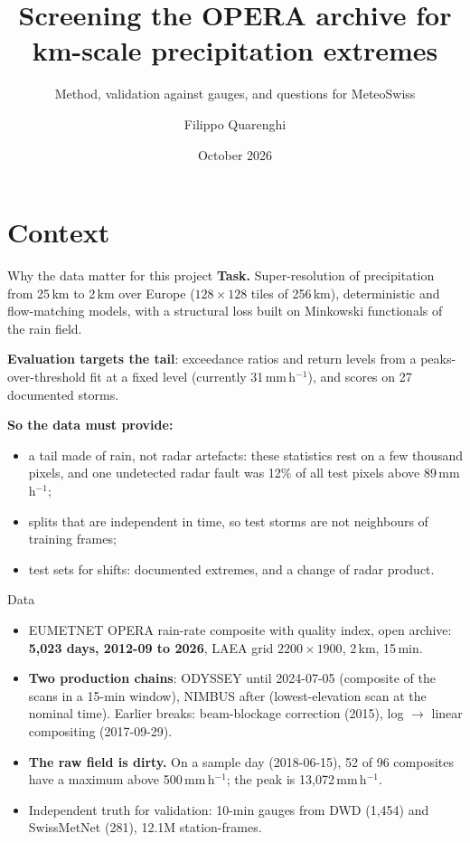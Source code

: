 \documentclass[aspectratio=169,10pt]{beamer}
\title{Screening the OPERA archive for km-scale precipitation extremes}
\subtitle{Method, validation against gauges, and questions for MeteoSwiss}
\author{Filippo Quarenghi}
\institute{University of Lausanne}
\date{October 2026}
\newcommand{\mmh}{\,mm\,h$^{-1}$}
\begin{document}
\begin{frame}
  \titlepage
\end{frame}

\section{Context}

\begin{frame}{Why the data matter for this project}
  \small
  \textbf{Task.} Super-resolution of precipitation from 25\,km to 2\,km over Europe
  ($128\times128$ tiles of 256\,km), deterministic and flow-matching models, with a structural
  loss built on Minkowski functionals of the rain field.
  \vspace{2mm}

  \textbf{Evaluation targets the tail}: exceedance ratios and return levels from a
  peaks-over-threshold fit at a fixed level (currently 31\mmh), and scores on 27 documented
  storms.
  \vspace{2mm}

  \textbf{So the data must provide:}
  \begin{itemize}
    \item a tail made of rain, not radar artefacts: these statistics rest on a few thousand
      pixels, and one undetected radar fault was 12\% of all test pixels above 89\mmh;
    \item splits that are independent in time, so test storms are not neighbours of training
      frames;
    \item test sets for shifts: documented extremes, and a change of radar product.
  \end{itemize}
\end{frame}

\begin{frame}{Data}
  \small
  \begin{itemize}
    \item EUMETNET OPERA rain-rate composite with quality index, open archive:
      \textbf{5,023 days, 2012-09 to 2026}, LAEA grid $2200\times1900$, 2\,km, 15\,min.
    \item \textbf{Two production chains}: ODYSSEY until 2024-07-05 (composite of the scans in
      a 15-min window), NIMBUS after (lowest-elevation scan at the nominal time). Earlier
      breaks: beam-blockage correction (2015), log $\to$ linear compositing (2017-09-29).
    \item \textbf{The raw field is dirty.} On a sample day (2018-06-15), 52 of 96 composites
      have a maximum above 500\mmh; the peak is 13,072\mmh.
    \item Independent truth for validation: 10-min gauges from DWD (1,454) and SwissMetNet
      (281), 12.1M station-frames.
  \end{itemize}
\end{frame}
\end{document}
